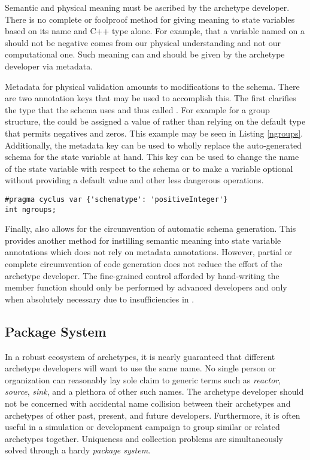 Semantic and physical meaning must be ascribed by the archetype developer. There
is no complete or foolproof method for giving meaning to state variables based
on its name and C++ type alone. For example, that a variable named  
on a  should not be negative comes from our physical understanding
and not our computational one. Such meaning can and should be given by the 
archetype developer via metadata.

Metadata for physical validation amounts to modifications to the schema. There are 
two annotation keys that may be used to accomplish this.  The first clarifies the 
type that the schema uses and thus called .  For example for a
group structure, the  could be assigned a value of 
 rather than relying on the default  type
that permits negatives and zeros. This example may be seen in Listing \ref{ngroups}. 
Additionally, the metadata key 
can be used to wholly replace the auto-generated schema for the state variable at 
hand. This key can be used to change the name of the state variable with respect 
to the schema or to make a variable optional without providing a default value 
and other less dangerous operations.

\begin{lstlisting}[caption={Physical Constraint Addition via `schematype'}, label=ngroups]
#pragma cyclus var {'schematype': 'positiveInteger'}
int ngroups;
\end{lstlisting}

Finally, \Cyclus also allows for the circumvention of automatic schema generation. This 
provides another method for instilling semantic meaning into state variable annotations
which does not rely on metadata annotations.
However, partial or complete circumvention of code generation does not reduce 
the effort of the archetype developer. The fine-grained control afforded by 
hand-writing the  member function should only be performed 
by advanced developers and only when absolutely necessary due to insufficiencies 
in \cycpp.

\subsection{Package System}

In a robust ecosystem of archetypes, it is nearly guaranteed that different archetype
developers will want to use the same name. No single person or organization can 
reasonably lay sole claim to generic terms such as \emph{reactor}, \emph{source}, 
\emph{sink}, and a plethora of other such names. The archetype developer should not 
be concerned with accidental name collision between their archetypes and archetypes
of other
past, present, and future developers.  Furthermore, it is often useful in a 
simulation or 
development campaign to group similar or related archetypes together. Uniqueness
and collection problems are simultaneously solved through a hardy \emph{package system}.

